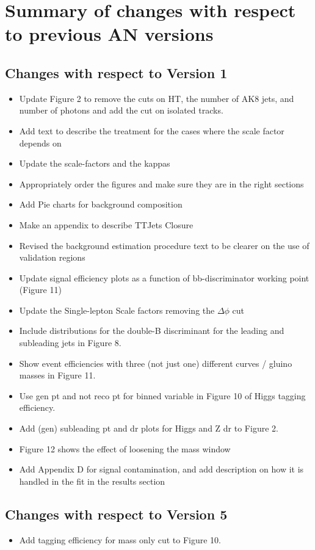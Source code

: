 \section{Summary of changes with respect to previous AN versions}
\label{sec:changes}

\subsection{Changes with respect to Version 1}

\begin{itemize}
\item Update Figure 2 to remove the cuts on HT, the number of AK8 jets, and number of photons and add the cut on isolated tracks.
\item Add text to describe the treatment for the cases where the scale factor depends on \MET   
\item Update the scale-factors and the kappas
\item Appropriately order the figures and make sure they are in the right sections
\item Add Pie charts for background composition
\item Make an appendix to describe TTJets Closure
\item Revised the background estimation procedure text to be clearer on the use of validation regions
\item Update signal efficiency plots as a function of bb-discriminator working point (Figure 11)
\item Update the Single-lepton Scale factors removing the $\Delta\phi$ cut
\item Include distributions for the double-B discriminant for the leading and subleading jets in Figure 8.
\item Show event efficiencies with three (not just one) different curves / gluino masses in Figure 11.
\item Use gen pt and not reco pt for binned variable in Figure 10 of Higgs tagging efficiency.
\item Add (gen) subleading pt and dr plots for Higgs and Z dr to Figure 2.
\item Figure 12 shows the effect of loosening the mass window
\item Add Appendix D for signal contamination, and add description on how it is handled in the fit in the results section
\end{itemize}

\subsection{Changes with respect to Version 5}

\begin{itemize}
\item Add tagging efficiency for mass only cut to Figure 10.
\end{itemize}

